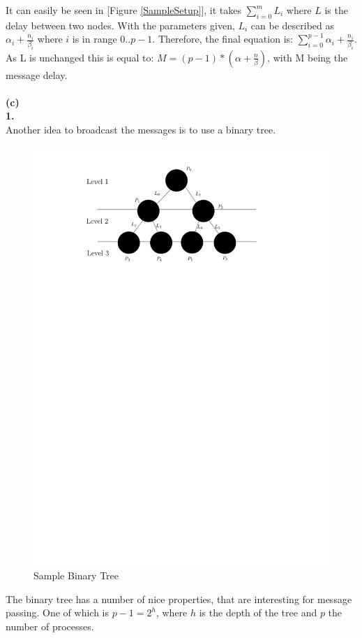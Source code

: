 \documentclass[a4paper,twoside,11pt]{article}
\begin{document}
It can easily be seen in [Figure \ref{SampleSetup}], it takes $\sum\limits_{i=0}^m L_i$ where $L$ is the delay between two nodes.
With the parameters given, $L_i$ can be described as $\alpha_i + \frac{n_i}{\beta_i}$ where $i$ is in range $0 .. p-1$.
Therefore, the final equation is: $\sum\limits_{i=0}^{p-1} \alpha_i + \frac{n_i}{\beta_i}$.
As L is unchanged this is equal to: $M = (p-1) * (\alpha + \frac{n}{\beta})$, with M being the message delay.
\\\\
\textbf{(c)\\ 1.}\hspace{1em}\\Another idea to broadcast the messages is to use a binary tree.
\begin{figure}[!htbp]
    \begin{center}
        \includegraphics[scale=1]{3c_1.pdf}
    \end{center}
    \caption{Sample Binary Tree}
    \label{BinTree}
\end{figure}
The binary tree has a number of nice properties, that are interesting for message passing.
One of which is $p-1=2^h$, where  $h$ is the depth of the tree and $p$ the number of processes.
\end{document}

